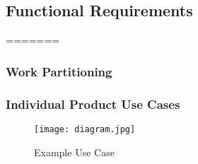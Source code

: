 \documentclass[12pt, titlepage]{article}
\begin{document}
    	\subsection{Functional Requirements}
	
=======
    		\subsubsection{Work Partitioning}
    		\subsubsection{Individual Product Use Cases}
    		 
            \begin{figure}[H]
                \centering
                \texttt{[image: diagram.jpg]}
                \caption{Example Use Case}
                \label{fig:my_label}
            \end{figure}
           
           

    		
    		
\end{document}
